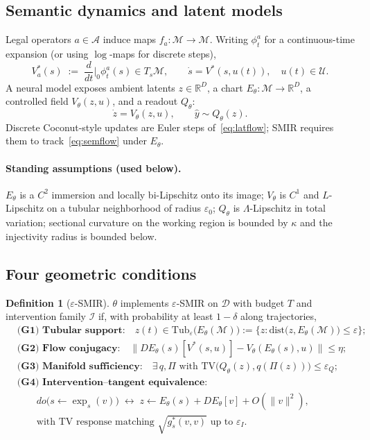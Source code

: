 \documentclass[letterpaper,10pt,twocolumn]{article}
\theoremstyle{definition}
\newtheorem{definition}{Definition}
\newcommand{\Tub}{\mathrm{Tub}}
\newcommand{\TV}{\mathrm{TV}}
\newcommand{\cM}{\mathcal{M}}
\newcommand{\cD}{\mathcal{D}}
\begin{document}
\subsection{Semantic dynamics and latent models}
Legal operators $a\in\mathcal{A}$ induce maps $f_a:\cM\to\cM$.
Writing $\phi_t^{a}$ for a continuous-time expansion (or using $\log$-maps for discrete steps),
\begin{equation}
V^*_a(s)
\;:=\;
\frac{d}{dt}\Big|_{0}\phi_t^{a}(s)
\in T_s\cM,
\qquad
\dot s = V^*(s,u(t)),\quad u(t)\in\mathcal{U}.
\label{eq:semflow}
\end{equation}
A neural model exposes ambient latents $z\in\mathbb{R}^D$, a chart $E_\theta:\cM\to\mathbb{R}^D$, a controlled field $V_\theta(z,u)$, and a readout $Q_\theta$:
\begin{equation}
\dot z = V_\theta(z,u),
\qquad
\hat y \sim Q_\theta(z).
\label{eq:latflow}
\end{equation}
Discrete Coconut-style updates are Euler steps of~\eqref{eq:latflow}; SMIR requires them to track~\eqref{eq:semflow} under $E_\theta$.

\paragraph{Standing assumptions (used below).}
$E_\theta$ is a $C^2$ immersion and locally bi-Lipschitz onto its image; $V_\theta$ is $C^1$ and $L$-Lipschitz on a tubular neighborhood of radius $\varepsilon_0$; $Q_\theta$ is $\Lambda$-Lipschitz in total variation; sectional curvature on the working region is bounded by $\kappa$ and the injectivity radius is bounded below.

\subsection{Four geometric conditions}
\begin{definition}[$\varepsilon$-SMIR]
\label{def:smir}
$\theta$ implements $\varepsilon$-SMIR on $\cD$ with budget $T$ and intervention family $\mathcal{I}$ if, with probability at least $1-\delta$ along trajectories,
\begin{align}
&\textbf{(G1) Tubular support:}\quad
z(t)\in
\Tub_\varepsilon\!\big(E_\theta(\cM)\big)
:=\big\{z:\mathrm{dist}\big(z,E_\theta(\cM)\big)\le\varepsilon\big\};
\label{eq:g1}\\
&\textbf{(G2) Flow conjugacy:}\quad
\big\|
DE_\theta(s)[V^*(s,u)]-V_\theta(E_\theta(s),u)
\big\|
\le\eta;
\label{eq:g2}\\
&\textbf{(G3) Manifold sufficiency:}\quad
\exists\,q,\Pi\text{ with }
\TV\big(Q_\theta(z),q(\Pi(z))\big)\le\varepsilon_Q;
\label{eq:g3}\\
&\textbf{(G4) Intervention--tangent equivalence:}\quad
\nonumber\\
&\qquad
do\!\big(s\leftarrow\exp_s(v)\big)
\;\longleftrightarrow\;
z\leftarrow E_\theta(s)+DE_\theta[v]+O(\|v\|^2),
\nonumber\\
&\qquad\text{with TV response matching $\sqrt{g^*_s(v,v)}$ up to $\varepsilon_I$.}
\label{eq:g4}
\end{align}
\end{definition}
\end{document}
